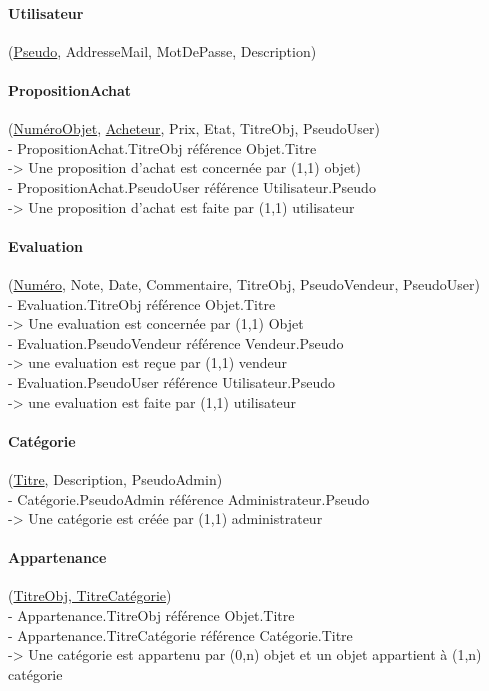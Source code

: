 \documentclass[a4paper,11pt]{article}
\begin{document}
\paragraph{Utilisateur} (\underline{Pseudo}, AddresseMail, MotDePasse, Description)\\

\paragraph{PropositionAchat} (\underline{NuméroObjet}, \underline{Acheteur}, Prix, Etat, TitreObj, PseudoUser)\\
\indent - PropositionAchat.TitreObj référence Objet.Titre \\
\indent \indent -> Une proposition d'achat est concernée par (1,1) objet)\\
\indent - PropositionAchat.PseudoUser référence Utilisateur.Pseudo \\
\indent \indent -> Une proposition d'achat est faite par (1,1) utilisateur


\paragraph{Evaluation} (\underline{Numéro}, Note, Date, Commentaire, TitreObj, PseudoVendeur, PseudoUser)\\
\indent - Evaluation.TitreObj référence Objet.Titre\\
\indent \indent -> Une evaluation est concernée par (1,1) Objet\\
\indent - Evaluation.PseudoVendeur référence Vendeur.Pseudo\\
\indent \indent -> une evaluation est reçue par (1,1) vendeur\\
\indent - Evaluation.PseudoUser référence Utilisateur.Pseudo\\
\indent \indent -> une evaluation est faite par (1,1) utilisateur 


\paragraph{Catégorie} (\underline{Titre}, Description, PseudoAdmin)\\
\indent - Catégorie.PseudoAdmin référence Administrateur.Pseudo\\
\indent \indent -> Une catégorie est créée par (1,1) administrateur


\paragraph{Appartenance} (\underline{TitreObj, TitreCatégorie})\\
\indent - Appartenance.TitreObj référence Objet.Titre\\
\indent - Appartenance.TitreCatégorie référence Catégorie.Titre\\
\indent \indent -> Une catégorie est appartenu par (0,n) objet et un objet appartient à (1,n) catégorie
\end{document}
